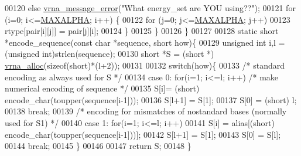 \begin{DoxyCode}
00120       \textcolor{keywordflow}{else} \hyperlink{group__utils_gabb76f8f8dbd652fa4a24037cf4524373}{vrna\_message\_error}(\textcolor{stringliteral}{"What energy\_set are YOU using??"});
00121       \textcolor{keywordflow}{for} (i=0; i<=\hyperlink{group__model__details_ga05a5ffe718aa431d97419a12fb082379}{MAXALPHA}; i++) \{
00122         \textcolor{keywordflow}{for} (j=0; j<=\hyperlink{group__model__details_ga05a5ffe718aa431d97419a12fb082379}{MAXALPHA}; j++)
00123           rtype[pair[i][j]] = pair[j][i];
00124       \}
00125    \}
00126 \}
00127 
00128 \textcolor{keyword}{static} \textcolor{keywordtype}{short} *encode\_sequence(\textcolor{keyword}{const} \textcolor{keywordtype}{char} *sequence, \textcolor{keywordtype}{short} how)\{
00129   \textcolor{keywordtype}{unsigned} \textcolor{keywordtype}{int} i,l = (\textcolor{keywordtype}{unsigned} int)strlen(sequence);
00130   \textcolor{keywordtype}{short}         *S = (\textcolor{keywordtype}{short} *) \hyperlink{group__utils_gaf37a0979367c977edfb9da6614eebe99}{vrna\_alloc}(\textcolor{keyword}{sizeof}(\textcolor{keywordtype}{short})*(l+2));
00131 
00132   \textcolor{keywordflow}{switch}(how)\{
00133     \textcolor{comment}{/* standard encoding as always used for S */}
00134     \textcolor{keywordflow}{case} 0:   \textcolor{keywordflow}{for}(i=1; i<=l; i++) \textcolor{comment}{/* make numerical encoding of sequence */}
00135                 S[i]= (\textcolor{keywordtype}{short}) encode\_char(toupper(sequence[i-1]));
00136               S[l+1] = S[1];
00137               S[0] = (short) l;
00138               \textcolor{keywordflow}{break};
00139     \textcolor{comment}{/* encoding for mismatches of nostandard bases (normally used for S1) */}
00140     \textcolor{keywordflow}{case} 1:   \textcolor{keywordflow}{for}(i=1; i<=l; i++)
00141                 S[i] = alias[(\textcolor{keywordtype}{short}) encode\_char(toupper(sequence[i-1]))];
00142               S[l+1] = S[1];
00143               S[0] = S[l];
00144               \textcolor{keywordflow}{break};
00145   \}
00146 
00147   \textcolor{keywordflow}{return} S;
00148 \}
\end{DoxyCode}
